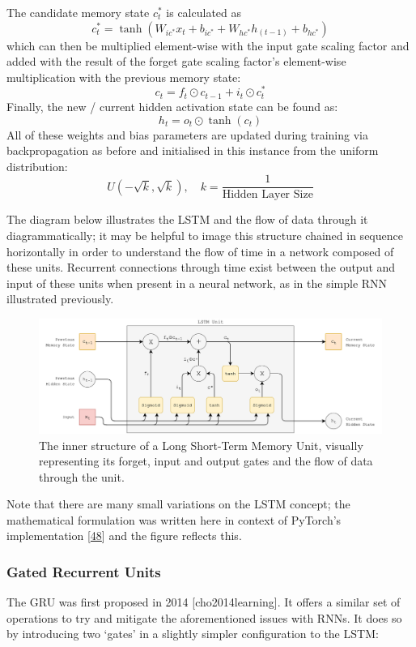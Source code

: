 \documentclass[12pt,]{article}
\begin{document}
The candidate memory state \(c^*_t\) is calculated as
\[c^*_t = \tanh(W_{ic^*} x_t + b_{ic^*} + W_{hc^*} h_{(t-1)} + b_{hc^*})\]
which can then be multiplied element-wise with the input gate scaling
factor and added with the result of the forget gate scaling factor's
element-wise multiplication with the previous memory state:
\[c_t = f_t \odot c_{t-1} + i_t \odot c^*_t\] Finally, the new / current
hidden activation state can be found as: \[h_t = o_t \odot \tanh(c_t)\]
All of these weights and bias parameters are updated during training via
backpropagation as before and initialised in this instance from the
uniform distribution:
\[U(-\sqrt{k}, \sqrt{k}),\quad k = \frac{1}{\text{Hidden Layer Size}}\]

The diagram below illustrates the LSTM and the flow of data through it
diagrammatically; it may be helpful to image this structure chained in
sequence horizontally in order to understand the flow of time in a
network composed of these units. Recurrent connections through time
exist between the output and input of these units when present in a
neural network, as in the simple RNN illustrated previously.

\begin{figure}
\centering
\includegraphics{Images/lstm.png}
\caption{The inner structure of a Long Short-Term Memory Unit, visually
representing its forget, input and output gates and the flow of data
through the unit.}
\end{figure}

Note that there are many small variations on the LSTM concept; the
mathematical formulation was written here in context of PyTorch's
implementation {[}\protect\hyperlink{ref-pytorchlstm}{48}{]} and the
figure reflects this.

\hypertarget{gated-recurrent-units}{%
\subsubsection{Gated Recurrent Units}\label{gated-recurrent-units}}

The GRU was first proposed in 2014 {[}cho2014learning{]}. It offers a
similar set of operations to try and mitigate the aforementioned issues
with RNNs. It does so by introducing two `gates' in a slightly simpler
configuration to the LSTM:
\end{document}
